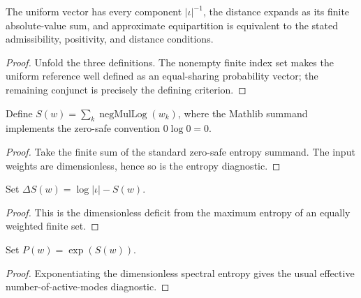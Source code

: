 \begin{theorem}
\label{thm:thermal:equipartition-spec}
The uniform vector has every component $|\iota|^{-1}$, the distance expands
as its finite absolute-value sum, and approximate equipartition is equivalent
to the stated admissibility, positivity, and distance conditions.
\end{theorem}
\begin{proof}

\leanok
Unfold the three definitions.  The nonempty finite index set makes the
uniform reference well defined as an equal-sharing probability vector; the
remaining conjunct is precisely the defining criterion.
\end{proof}

\begin{definition}
\label{def:thermal:spectral-entropy}
Define $S(w)=\sum_k\operatorname{negMulLog}(w_k)$, where the Mathlib
summand implements the zero-safe convention $0\log0=0$.
\end{definition}
\begin{proof}

\leanok
Take the finite sum of the standard zero-safe entropy summand.  The input
weights are dimensionless, hence so is the entropy diagnostic.
\end{proof}

\begin{definition}
\label{def:thermal:entropy-deficit}
Set $\Delta S(w)=\log|\iota|-S(w)$.
\end{definition}
\begin{proof}

\leanok
This is the dimensionless deficit from the maximum entropy of an equally
weighted finite set.
\end{proof}

\begin{definition}
\label{def:thermal:participation-number}
Set $P(w)=\exp(S(w))$.
\end{definition}
\begin{proof}

\leanok
Exponentiating the dimensionless spectral entropy gives the usual effective
number-of-active-modes diagnostic.
\end{proof}

